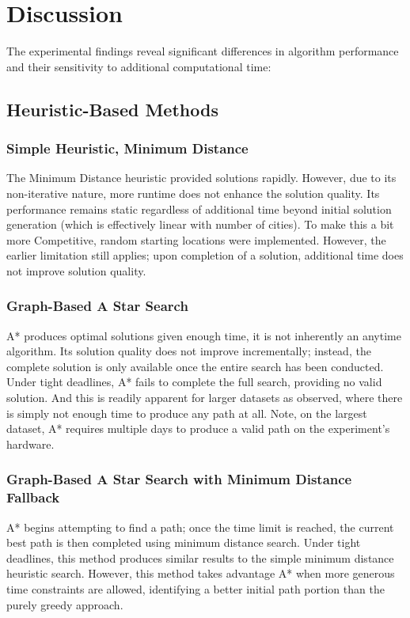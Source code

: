 \documentclass[11pt]{article}
\begin{document}
	
	\section{Discussion}
	The experimental findings reveal significant differences in algorithm performance and their sensitivity to additional computational time:
	
	\subsection{Heuristic-Based Methods}	
	\subsubsection{Simple Heuristic, Minimum Distance}
	The Minimum Distance heuristic provided solutions rapidly. However, due to its non-iterative nature, more runtime does not enhance the solution quality. Its performance remains static regardless of additional time beyond initial solution generation (which is effectively linear with number of cities). To make this a bit more Competitive, random starting locations were implemented. However, the earlier limitation still applies; upon completion of a solution, additional time does not improve solution quality.
	
	\subsubsection{Graph-Based A Star Search}
	A* produces optimal solutions given enough time, it is not inherently an anytime algorithm. Its solution quality does not improve incrementally; instead, the complete solution is only available once the entire search has been conducted. Under tight deadlines, A* fails to complete the full search, providing no valid solution. And this is readily apparent for larger datasets as observed, where there is simply not enough time to produce any path at all. Note, on the largest dataset, A* requires multiple days to produce a valid path on the experiment's hardware.
	
	\subsubsection{Graph-Based A Star Search with Minimum Distance Fallback}
	A* begins attempting to find a path; once the time limit is reached, the current best path is then completed using minimum distance search. Under tight deadlines, this method produces similar results to the simple minimum distance heuristic search. However, this method takes advantage A* when more generous time constraints are allowed, identifying a better initial path portion than the purely greedy approach.
	
\end{document}

